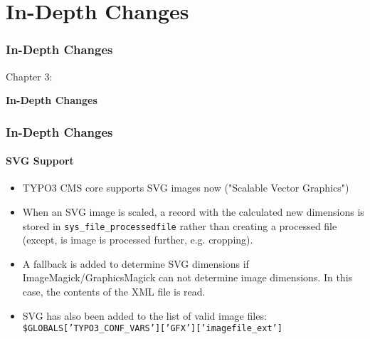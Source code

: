 %

\section{In-Depth Changes}
\begin{frame}[fragile]
	\frametitle{In-Depth Changes}

	\begin{center}\huge{Chapter 3:}\end{center}
	\begin{center}\huge{\color{typo3darkgrey}\textbf{In-Depth Changes}}\end{center}

\end{frame}

\begin{frame}[fragile]
	\frametitle{In-Depth Changes}
	\framesubtitle{SVG Support}

	\begin{itemize}
		\item TYPO3 CMS core supports SVG images now ("Scalable Vector Graphics")

		\item When an SVG image is scaled, a record with the calculated new dimensions
			is stored in \texttt{sys\_file\_processedfile} rather than creating a
			processed file\newline
			\small(except, is image is processed further, e.g. cropping)\normalsize.

		\item A fallback is added to determine SVG dimensions if ImageMagick/GraphicsMagick
			can not determine image dimensions. In this case, the contents of the XML file
			is read.

		\item SVG has also been added to the list of valid image files:\newline
			\texttt{\$GLOBALS['TYPO3\_CONF\_VARS']['GFX']['imagefile\_ext']}

	\end{itemize}

\end{frame}


